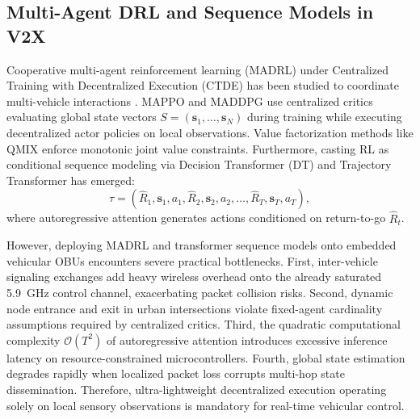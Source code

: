 \documentclass[journal]{IEEEtran}
\begin{document}
\subsection{Multi-Agent DRL and Sequence Models in V2X}
Cooperative multi-agent reinforcement learning (MADRL) under Centralized Training with Decentralized Execution (CTDE) has been studied to coordinate multi-vehicle interactions \cite{Wang2023Multi, Yu2022Surprising, Lowe2017Multi}. MAPPO \cite{Yu2022Surprising} and MADDPG \cite{Lowe2017Multi} use centralized critics evaluating global state vectors $S = (\mathbf{s}_1, \dots, \mathbf{s}_N)$ during training while executing decentralized actor policies on local observations. Value factorization methods like QMIX \cite{Rashid2018QMIX} enforce monotonic joint value constraints. Furthermore, casting RL as conditional sequence modeling via Decision Transformer (DT) \cite{Chen2021Decision} and Trajectory Transformer \cite{Janner2021Offline} has emerged:
\begin{equation}
\label{eq:dt_seq}
\tau = \left( \hat{R}_1, \mathbf{s}_1, a_1, \hat{R}_2, \mathbf{s}_2, a_2, \dots, \hat{R}_T, \mathbf{s}_T, a_T \right),
\end{equation}
where autoregressive attention generates actions conditioned on return-to-go $\hat{R}_t$.

However, deploying MADRL and transformer sequence models onto embedded vehicular OBUs encounters severe practical bottlenecks. First, inter-vehicle signaling exchanges add heavy wireless overhead onto the already saturated 5.9~GHz control channel, exacerbating packet collision risks. Second, dynamic node entrance and exit in urban intersections violate fixed-agent cardinality assumptions required by centralized critics. Third, the quadratic computational complexity $\mathcal{O}(T^2)$ of autoregressive attention introduces excessive inference latency on resource-constrained microcontrollers. Fourth, global state estimation degrades rapidly when localized packet loss corrupts multi-hop state dissemination. Therefore, ultra-lightweight decentralized execution operating solely on local sensory observations is mandatory for real-time vehicular control.
\end{document}
